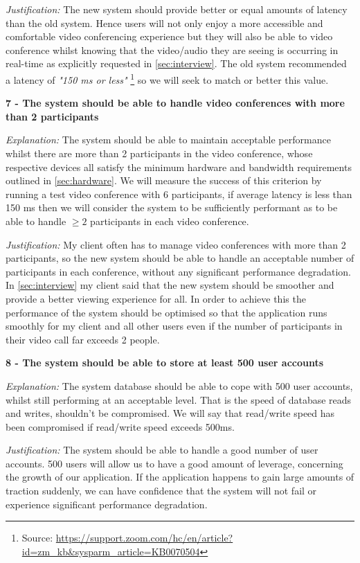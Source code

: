 \textit{Justification:}
The new system should provide better or equal amounts of 
latency than the old system. Hence users will not only enjoy
a more accessible and comfortable video conferencing 
experience but they will also be able to video conference 
whilst knowing that the video/audio they are seeing is
occurring in real-time as explicitly requested in 
\ref{sec:interview}. The old system recommended a latency of
\textit{"150 ms or less"} \footnote{Source:
\url{https://support.zoom.com/hc/en/article?id=zm_kb&sysparm_article=KB0070504}} 
so we will seek to match or better this value.

\vspace{0.2cm}

\textsf{\bfseries 7 - The system should be able to handle video 
conferences with more than 2 participants}

\vspace{0.1cm}

\textit{Explanation:}
The system should be able to maintain acceptable performance
whilst there are more than 2 participants in the video 
conference, whose respective devices all satisfy the minimum
hardware and bandwidth requirements outlined in 
\ref{sec:hardware}. We will measure the success of this 
criterion by running a test video conference with 6 
participants, if average latency is less than 150 ms then we
will consider the system to be sufficiently performant as to 
be able to handle $\geq 2$ participants in each video
conference.
\vspace{0.1cm}

\textit{Justification:}
My client often has to manage video conferences with more than
2 participants, so the new system should be able to handle an 
acceptable number of participants in each conference, without
any significant performance degradation. In
\ref{sec:interview} my client said that the new system 
should be smoother and provide a better viewing experience 
for all. In order to achieve this the performance of the 
system should be optimised so that the application runs 
smoothly for my client and all other users even if the
number of participants in their video call far exceeds 2 
people.

\vspace{0.2cm}

\textsf{\bfseries 8 - The system should be able to store at 
least 500 user accounts}

\vspace{0.1cm}

\textit{Explanation:}
The system database should be able to cope with 500 user 
accounts, whilst still performing at an acceptable level.
That is the speed of database reads and writes, shouldn't
be compromised. We will say that read/write speed has been 
compromised if read/write speed exceeds 500ms.
\vspace{0.1cm}

\textit{Justification:}
The system should be able to handle a good number of user 
accounts. 500 users will allow us to have a good amount of 
leverage, concerning the growth of our application. If the 
application happens to gain large amounts of traction
suddenly, we can have confidence that the system will not 
fail or experience significant performance degradation.

